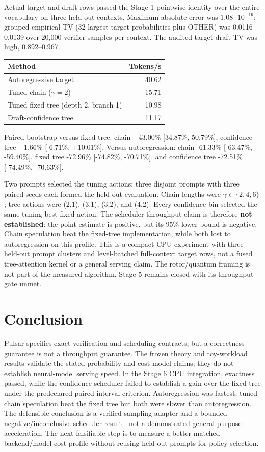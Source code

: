 \documentclass[11pt,a4paper]{article}
\theoremstyle{definition}
\begin{document}
Actual target and draft rows passed the Stage 1 pointwise identity over the
entire vocabulary on three held-out contexts. Maximum absolute error was
$1.08\cdot10^{-19}$; grouped empirical TV (32 largest target probabilities
plus OTHER) was 0.0116--0.0139 over 20,000 verifier samples per context. The
audited target-draft TV was high, 0.892--0.967.

\begin{center}
\begin{tabular}{lr}
\toprule
Method & Tokens/s \\
\midrule
Autoregressive target & 40.62 \\
Tuned chain ($\gamma=2$) & 15.71 \\
Tuned fixed tree (depth 2, branch 1) & 10.98 \\
Draft-confidence tree & 11.17 \\
\bottomrule
\end{tabular}
\end{center}

Paired bootstrap versus fixed tree: chain +43.00\% [34.87\%, 50.79\%],
confidence tree +1.66\% [-6.71\%, +10.01\%]. Versus autoregression:
chain -61.33\% [-63.47\%, -59.40\%], fixed tree -72.96\%
[-74.82\%, -70.71\%], and confidence tree -72.51\%
[-74.49\%, -70.63\%].

Two prompts selected the tuning actions; three disjoint prompts with three
paired seeds each formed the held-out evaluation. Chain lengths were
$\gamma\in\{2,4,6\}$; tree actions were (2,1), (3,1), (3,2), and (4,2).
Every confidence bin selected the same tuning-best fixed action. The scheduler
throughput claim is therefore \textbf{not established}: the point estimate is
positive, but its 95\% lower bound is negative. Chain speculation beat the
fixed-tree implementation, while both lost to autoregression on this profile.
This is a compact CPU experiment with three held-out prompt clusters and
level-batched full-context target rows, not a fused tree-attention kernel or a
general serving claim. The rotor/quantum framing is not part of the measured
algorithm. Stage 5 remains closed with its throughput gate unmet.

\section{Conclusion}
Pulsar specifies exact verification and scheduling contracts, but a correctness
guarantee is not a throughput guarantee. The frozen theory and toy-workload
results validate the stated probability and cost-model claims; they do not
establish neural-model serving speed. In the Stage 6 CPU integration, exactness
passed, while the confidence scheduler failed to establish a gain over the
fixed tree under the predeclared paired-interval criterion. Autoregression was
fastest; tuned chain speculation beat the fixed tree but both were slower than
autoregression. The defensible conclusion is a verified sampling adapter and a
bounded negative/inconclusive scheduler result---not a demonstrated
general-purpose acceleration. The next falsifiable step is to measure a
better-matched backend/model cost profile without reusing held-out prompts for
policy selection.
\end{document}
